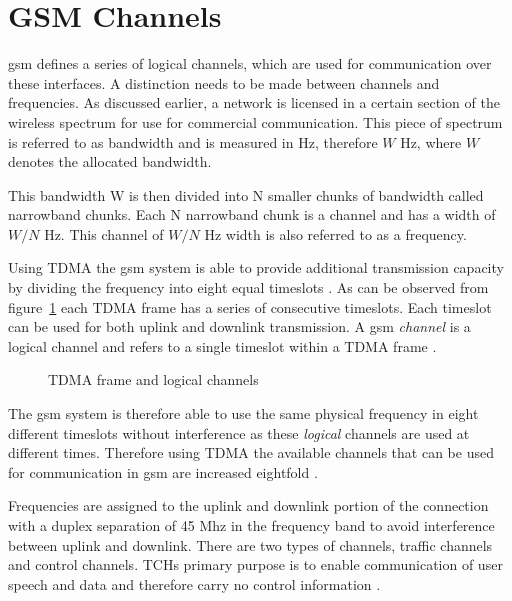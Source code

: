 \section{GSM Channels}
\label{sec:interfacech}
\gls{gsm} defines a series of logical channels, which are used for communication over these interfaces. A distinction needs to be made between channels and frequencies. As discussed earlier, a network is licensed in a certain section of the wireless spectrum for use for commercial communication. This piece of spectrum is referred to as bandwidth and is measured in Hz, therefore $W$ Hz, where $W$ denotes the allocated bandwidth\cite{FundamentalsWirelessCommunication}.

This bandwidth W is then divided into N smaller chunks of bandwidth called narrowband chunks. Each N narrowband chunk is a channel and has a width of $W/N$ Hz\cite{FundamentalsWirelessCommunication}. This channel of $W/N$ Hz width is also referred to as a frequency.\label{def:channel}

Using \gls{TDMA} the \gls{gsm} system is able to provide additional transmission capacity by dividing the frequency into eight equal timeslots \cite{wirelesstelcoMullet}. 
As can be observed from figure~\ref{fig:GSMChannels} each \gls{TDMA} frame has a series of consecutive timeslots. Each timeslot can be used for both uplink and downlink transmission. A \gls{gsm} \emph{channel} is a logical channel and refers to a single timeslot within a \gls{TDMA} frame \cite{wirelesstelcoMullet,GSMArchitectureProtocolsServices}.
\begin{figure}[H]
	\begin{centering}
		
		\caption{TDMA frame and logical channels \cite{wirelesstelcoMullet}}
		\label{fig:GSMChannels}
	\end{centering}
\end{figure}
The \gls{gsm} system is therefore able to use the same physical frequency in eight different timeslots without interference as these \emph{logical} channels are used at different times. Therefore using \gls{TDMA} the available channels that can be used for communication in \gls{gsm} are increased eightfold \cite{wirelesstelcoMullet}.

Frequencies are assigned to the uplink and downlink portion of the connection with a duplex separation of 45 Mhz in the frequency band to avoid interference between uplink and downlink. There are two types of channels, traffic channels and control channels. \glspl{TCH} primary purpose is to enable communication of user speech and data and therefore carry no control information \cite{GSMArchitectureProtocolsServices}.

